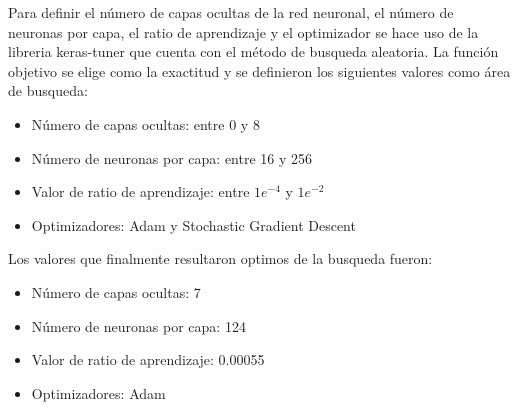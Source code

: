 \documentclass[conference]{IEEEtran}
\begin{document}
Para definir el número de capas ocultas de la red neuronal, el número de neuronas por capa, el ratio de aprendizaje y el optimizador se hace uso de la libreria keras-tuner que cuenta con el método de busqueda aleatoria. La función objetivo se elige como la exactitud y se definieron los siguientes valores como área de busqueda: 

\begin{itemize}
\item Número de capas ocultas: entre 0 y 8 
\item Número de neuronas por capa: entre 16 y 256
\item Valor de ratio de aprendizaje: entre $1e^{-4}$ y $1e^{-2}$
\item Optimizadores: Adam y Stochastic Gradient Descent
\end{itemize} 

Los valores que finalmente resultaron optimos de la busqueda fueron: 
\begin{itemize}
\item Número de capas ocultas: 7 
\item Número de neuronas por capa: 124
\item Valor de ratio de aprendizaje: 0.00055
\item Optimizadores: Adam 
\end{itemize} 
\end{document}
